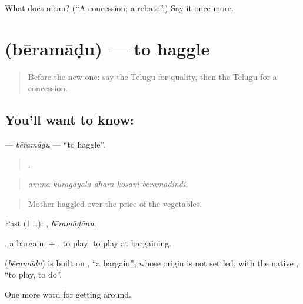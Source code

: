 \begin{tcolorbox}[breakable,colback=teal!4,colframe=teal!35!black,title={Before you move on}]
What does  mean? (\textquotedblleft{}A concession; a rebate\textquotedblright{}.) Say it once more.
\end{tcolorbox}
\section[\texorpdfstring{\te{బేరమాడు} (bēramāḍu)}{బేరమాడు (bēramāḍu)}]{ (bēramāḍu) — to haggle}

\label{lesson:TE-C484-beramadu}



\begin{quote}
Before the new one: say the Telugu for quality, then the Telugu for a concession.
\end{quote}

\subsection*{You'll want to know: }
\textbf{} — \emph{bēramāḍu} — \textquotedblleft{}to haggle\textquotedblright{}.

\begin{quote}
    .
\end{quote}

\begin{quote}
\emph{amma kūragāyala dhara kōsaṁ bēramāḍindi.}
\end{quote}

\begin{quote}
Mother haggled over the price of the vegetables.
\end{quote}

Past (I …): , \emph{bēramāḍānu}.

, a bargain, + , to play: to play at bargaining.

\begin{cousinweb}
\textbf{} (\emph{bēramāḍu}) is built on , \textquotedblleft{}a bargain\textquotedblright{}, whose origin is not settled, with the native , \textquotedblleft{}to play, to do\textquotedblright{}.
\end{cousinweb}

\begin{grammarlens}[title={What you've built}]
One more word for getting around.
\end{grammarlens}

